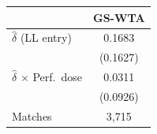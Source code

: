 \begin{tabular}{lc}
\toprule
 & GS-WTA \\
\midrule
$\hat{\delta}$ (LL entry) & 0.1683 \\
 & (0.1627) \\
$\hat{\delta}$ $\times$ Perf.\ dose & 0.0311 \\
 & (0.0926) \\
\midrule
Matches & 3,715 \\
\bottomrule
\end{tabular}
